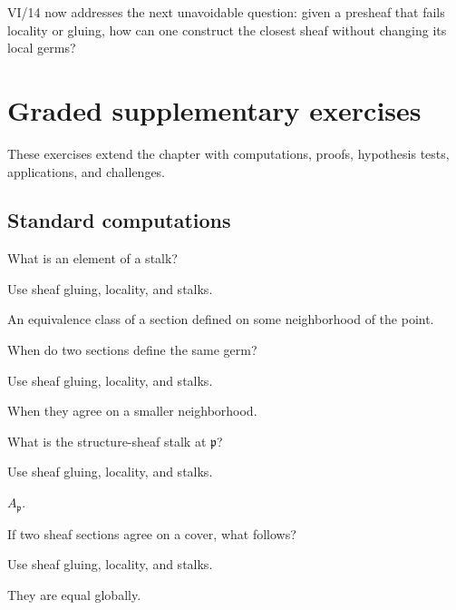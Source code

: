 VI/14 now addresses the next unavoidable question: given a presheaf that fails locality or
gluing, how can one construct the closest sheaf without changing its local germs?
\section{Graded supplementary exercises}
These exercises extend the chapter with computations, proofs, hypothesis tests, applications, and challenges.

\subsection*{Standard computations}

\begin{exercise}[Germ]\label{exr:vi13-expand-01}
What is an element of a stalk?
\end{exercise}
\begin{hint}
Use sheaf gluing, locality, and stalks.
\end{hint}
\begin{solution}
An equivalence class of a section defined on some neighborhood of the point.
\end{solution}

\begin{exercise}\label{exr:vi13-expand-02}
When do two sections define the same germ?
\end{exercise}
\begin{hint}
Use sheaf gluing, locality, and stalks.
\end{hint}
\begin{solution}
When they agree on a smaller neighborhood.
\end{solution}

\begin{exercise}\label{exr:vi13-expand-03}
What is the structure-sheaf stalk at $\mathfrak p$?
\end{exercise}
\begin{hint}
Use sheaf gluing, locality, and stalks.
\end{hint}
\begin{solution}
$A_{\mathfrak p}$.
\end{solution}

\begin{exercise}[Locality]\label{exr:vi13-expand-04}
If two sheaf sections agree on a cover, what follows?
\end{exercise}
\begin{hint}
Use sheaf gluing, locality, and stalks.
\end{hint}
\begin{solution}
They are equal globally.
\end{solution}


